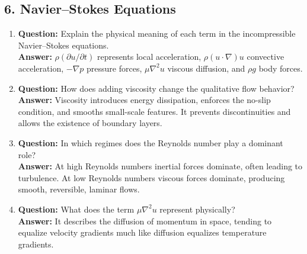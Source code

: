 \documentclass[12pt]{article}
\begin{document}
\subsection*{6. Navier--Stokes Equations}
\begin{enumerate}
\item \textbf{Question:} Explain the physical meaning of each term in the incompressible Navier--Stokes equations.\\
\textbf{Answer:} $\rho(\partial u/\partial t)$ represents local acceleration, $\rho(u \cdot \nabla)u$ convective acceleration, $-\nabla p$ pressure forces, $\mu \nabla^2 u$ viscous diffusion, and $\rho g$ body forces.

\item \textbf{Question:} How does adding viscosity change the qualitative flow behavior?\\
\textbf{Answer:} Viscosity introduces energy dissipation, enforces the no-slip condition, and smooths small-scale features. It prevents discontinuities and allows the existence of boundary layers.

\item \textbf{Question:} In which regimes does the Reynolds number play a dominant role?\\
\textbf{Answer:} At high Reynolds numbers inertial forces dominate, often leading to turbulence. At low Reynolds numbers viscous forces dominate, producing smooth, reversible, laminar flows.

\item \textbf{Question:} What does the term $\mu \nabla^2 u$ represent physically?\\
\textbf{Answer:} It describes the diffusion of momentum in space, tending to equalize velocity gradients much like diffusion equalizes temperature gradients.
\end{enumerate}
\end{document}
